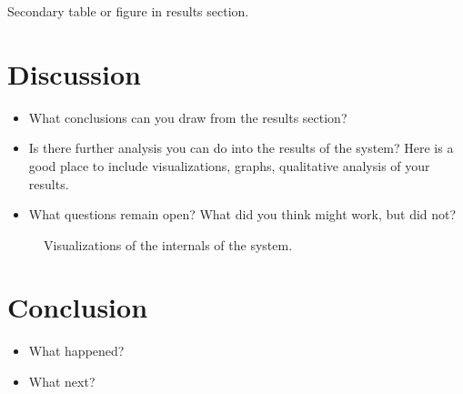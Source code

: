 \documentclass{article}
\begin{document}
\begin{table}
  \centering
  \missingfigure[figheight=5cm]{}
  \caption{Secondary table or figure in results section.}
  \label{fig:mainres}
\end{table}

\lipsum[7-11]

\section{Discussion}



\begin{itemize}
\item What conclusions can you draw from the results section?
\item Is there further analysis you can do into the results of the system? Here is a good place to include visualizations, graphs, qualitative analysis of your results.

\item  What questions remain open? What did you think might work, but did not?
\end{itemize}

\lipsum[4-8]

\begin{figure}
  \centering
  \missingfigure{}
  \missingfigure{}
  \missingfigure{}
  \caption{Visualizations of the internals of the system.}
\end{figure}

\section{Conclusion}

\begin{itemize}
\item What happened?
\item What next?
\end{itemize}

\lipsum[4-6]







\end{document}
